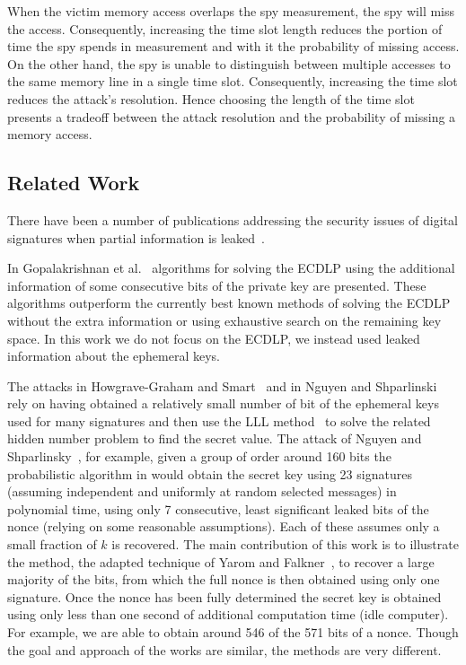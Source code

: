 \documentclass[twocolumn]{svjour3}
\begin{document}
When the victim memory access overlaps the spy measurement, the spy will miss the access.
Consequently, increasing the time slot length reduces the portion of time the spy spends in
measurement and with it the probability of missing access.
On the other hand, the spy is unable to distinguish between multiple accesses to the same memory line in 
a single time slot.
Consequently, increasing the time slot reduces the attack's resolution.
Hence choosing the length of the time slot presents a tradeoff between the attack resolution
and the probability of missing a memory access.


\subsection{Related Work}\label{sec:related}
There have been a number of publications addressing the security issues of digital signatures when partial information is leaked~\cite{Howgrave-GrahamS01,gopalakrishnan07solving,nguyen03insecurity}. 

In Gopalakrishnan et al.~\cite{gopalakrishnan07solving} algorithms for solving the ECDLP using the additional information of some consecutive bits of the private key are presented. These algorithms outperform the currently best known methods of solving the ECDLP without the extra information or using exhaustive search on the remaining key space. In this work we do not focus on the ECDLP, we instead used leaked information about the ephemeral keys. 

The attacks in Howgrave-Graham and Smart~\cite{Howgrave-GrahamS01} and in Nguyen and Shparlinski~\cite{nguyen03insecurity} 
rely on having obtained a relatively small number of bit of the ephemeral keys used for many signatures and then use the LLL method~\cite{LLL} to solve the related hidden number problem to find the secret value.
 The attack of Nguyen and Shparlinsky~\cite{nguyen03insecurity}, for example, given a group of order around 160 bits the probabilistic algorithm in would obtain the secret key using 23 signatures (assuming independent and uniformly at random selected messages) in polynomial time, using only 7 consecutive, least significant leaked bits of the nonce (relying on some reasonable assumptions). Each of these assumes only a small fraction of $k$ is recovered. The main contribution of this work is to illustrate the method, the adapted technique of Yarom and Falkner~\cite{yarom13flush}, to recover a large majority of the bits, from which the full nonce is then obtained using only one signature. Once the nonce has been fully determined the secret key is obtained using only less than one second of additional computation time (idle computer). 
For example, we are able to obtain around 546 of the 571 bits of a nonce. Though the goal and approach of the works are similar, the methods are very different.
\end{document}
